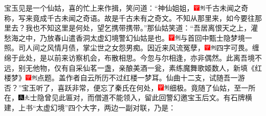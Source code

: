 宝玉见是一个仙姑，喜的忙上来作揖，笑问道：“神仙姐姐，{\includegraphics[width=3mm]{../Images/00002}\includegraphics[width=3mm]{../Images/00011}\footnotesize \kaishu 千古未闻之奇称，写来竟成千古未闻之奇语。故是千古未有之奇文。}不知从那里来，如今要往那里去？我也不知这里是何处，望乞携带携带。”那仙姑笑道：“吾居离恨天之上，灌愁海之中，乃放春山遣香洞太虚幻境警幻仙姑是也。{\includegraphics[width=3mm]{../Images/00002}\includegraphics[width=3mm]{../Images/00011}\footnotesize \kaishu 与首回中甄士隐梦境一照。}司人间之风情月债，掌尘世之女怨男痴。因近来风流冤孽，{\includegraphics[width=3mm]{../Images/00002}\includegraphics[width=3mm]{../Images/00011}\footnotesize \kaishu 四字可畏。}缠绵于此处，是以前来访察机会，布散相思。今忽与尔相逢，亦非偶然。此离吾境不远，别无他物，仅有自采仙茗一盏，亲酿美酒一瓮，素练魔舞歌姬数人，新填《红楼梦》{\includegraphics[width=3mm]{../Images/00002}\includegraphics[width=3mm]{../Images/00011}\footnotesize \kaishu 点题。盖作者自云所历不过红楼一梦耳。}仙曲十二支，试随吾一游否？”宝玉听了，喜跃非常，便忘了秦氏在何处，{\includegraphics[width=3mm]{../Images/00002}\includegraphics[width=3mm]{../Images/00011}\footnotesize \kaishu 细极。}竟随了仙姑，至一所在，{\includegraphics[width=3mm]{../Images/00009}\includegraphics[width=3mm]{../Images/00012}\footnotesize \kaishu 士隐曾见此匾对，而僧道不能领入，留此回警幻邀宝玉后文。}有石牌横建，上书“太虚幻境”四个大字，两边一副对联，乃是：

